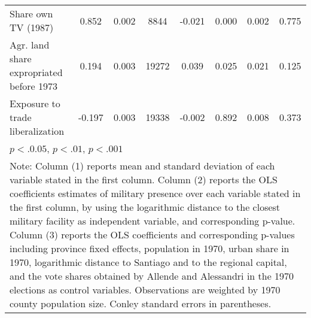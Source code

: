 \begin{tabular}{l*{7}{c}}
Share own TV (1987) &     0.852 &     0.002 & 8844 &    -0.021 & 0.000\sym{***} &     0.002 & 0.775  \\
Agr. land share expropriated before 1973 &     0.194 &     0.003 & 19272 &     0.039 & 0.025\sym{*} &     0.021 & 0.125  \\
Exposure to trade liberalization &    -0.197 &     0.003 & 19338 &    -0.002 & 0.892  &     0.008 & 0.373  \\
\hline\hline
\multicolumn{8}{l}{\footnotesize \sym{*} \(p<.0.05\), \sym{**} \(p<.01\), \sym{***} \(p<.001\)}\\
\multicolumn{8}{p{20cm}}{\footnotesize Note: Column (1) reports mean and standard deviation of each variable stated in the first column. Column (2) reports the OLS coefficients estimates of military presence over each variable stated in the first column, by using the logarithmic distance to the closest military facility as independent variable, and corresponding p-value. Column (3) reports the OLS coefficients and corresponding p-values including province fixed effects, population in 1970, urban share in 1970, logarithmic distance to Santiago and to the regional capital, and the vote shares obtained by Allende and Alessandri in the 1970 elections as control variables. Observations are weighted by 1970 county population size. Conley standard errors in parentheses.}\\
\end{tabular}